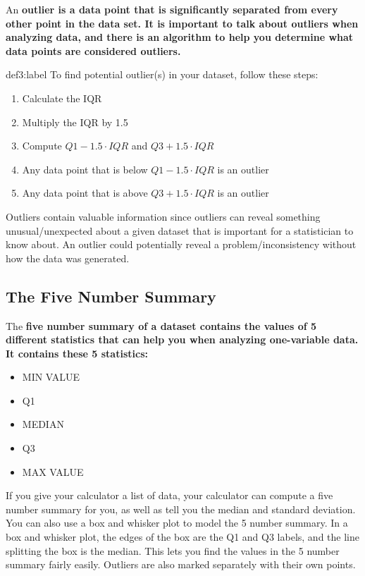 An \bf{outlier} is a data point that is significantly separated from every other point in the data set. It is important to talk about outliers when analyzing data, and there is an algorithm to help you determine what data points are considered outliers.

\begin{definition}{def3:label}
    To find potential outlier(s) in your dataset, follow these steps:

    \begin{enumerate}
        \item Calculate the IQR
        \item Multiply the IQR by 1.5
        \item Compute $Q1 - 1.5 \cdot IQR$ and $Q3 + 1.5 \cdot IQR$
        \item Any data point that is below $Q1 - 1.5 \cdot IQR$ is an outlier
        \item Any data point that is above $Q3 + 1.5 \cdot IQR$ is an outlier
    \end{enumerate}
\end{definition}

Outliers contain valuable information since outliers can reveal something unusual/unexpected about a given dataset that is important for a statistician to know about. An outlier could potentially reveal a problem/inconsistency without how the data was generated. \newpage


\subsection{The Five Number Summary}

The \bf{five number summary} of a dataset contains the values of 5 different statistics that can help you when analyzing one-variable data. It contains these 5 statistics:

\begin{itemize}
    \item MIN VALUE  
    \item Q1
    \item MEDIAN 
    \item Q3
    \item MAX VALUE
\end{itemize}

If you give your calculator a list of data, your calculator can compute a five number summary for you, as well as tell you the median and standard deviation. You can also use a box and whisker plot to model the 5 number summary. In a box and whisker plot, the edges of the box are the Q1 and Q3 labels, and the line splitting the box is the median. This lets you find the values in the 5 number summary fairly easily. Outliers are also marked separately with their own points. 



